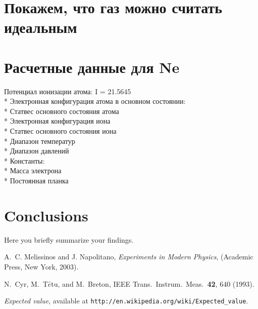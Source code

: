 \documentclass[letterpaper,12pt]{article}
\begin{document}
\section{Покажем, что газ можно считать идеальным}



\section{Расчетные данные для Ne}
Потенциал ионизации атома: I = 21.5645 
\\* Электронная конфигурация атома в основном состоянии: 
\\* Статвес основного состояния атома 
\\* Электронная конфигурация иона 
\\* Статвес основного состояния иона 
\\* Диапазон температур 
\\* Диапазон давлений 
\\* Константы: 
\\* Масса электрона 
\\* Постоянная планка

\section{Conclusions}
Here you briefly summarize your findings.


\begin{thebibliography}{99}

A.~C. Melissinos and J. Napolitano, \textit{Experiments in Modern Physics},
(Academic Press, New York, 2003).

N.\ Cyr, M.\ T$\hat{e}$tu, and M.\ Breton,
IEEE Trans.\ Instrum.\ Meas.\ \textbf{42}, 640 (1993).

 \emph{Expected value},  available at
\texttt{http://en.wikipedia.org/wiki/Expected\_value}.

\end{thebibliography}
\end{document}

